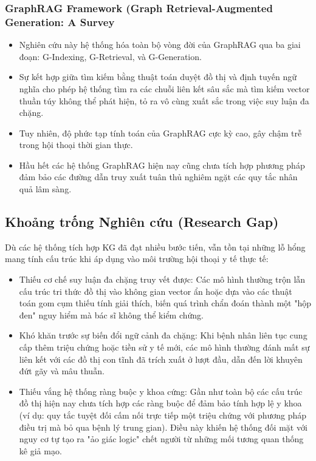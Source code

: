\documentclass[conference]{IEEEtran}
\begin{document}
\subsubsection{GraphRAG Framework (Graph Retrieval-Augmented Generation: A Survey \cite{peng2025graph}}
\begin{itemize}
    \item Nghiên cứu này hệ thống hóa toàn bộ vòng đời của GraphRAG qua ba giai đoạn: G-Indexing, G-Retrieval, và G-Generation.
    \item Sự kết hợp giữa tìm kiếm bằng thuật toán duyệt đồ thị và định tuyến ngữ nghĩa cho phép hệ thống tìm ra các chuỗi liên kết sâu sắc mà tìm kiếm vector thuần túy không thể phát hiện, tỏ ra vô cùng xuất sắc trong việc suy luận đa chặng.
    \item Tuy nhiên, độ phức tạp tính toán của GraphRAG cực kỳ cao, gây chậm trễ trong hội thoại thời gian thực.
    \item Hầu hết các hệ thống GraphRAG hiện nay cũng chưa tích hợp phương pháp đảm bảo các đường dẫn truy xuất tuân thủ nghiêm ngặt các quy tắc nhân quả lâm sàng.
\end{itemize}


\subsection{Khoảng trống Nghiên cứu (Research Gap)}

Dù các hệ thống tích hợp KG đã đạt nhiều bước tiến, vẫn tồn tại những lỗ hổng mang tính cấu trúc khi áp dụng vào môi trường hội thoại y tế thực tế:
\begin{itemize}
    \item Thiếu cơ chế suy luận đa chặng truy vết được: Các mô hình thường trộn lẫn cấu trúc tri thức đồ thị vào không gian vector ẩn hoặc dựa vào các thuật toán gom cụm thiếu tính giải thích, biến quá trình chẩn đoán thành một "hộp đen" nguy hiểm mà bác sĩ không thể kiểm chứng.
    \item Khó khăn trước sự biến đổi ngữ cảnh đa chặng: Khi bệnh nhân liên tục cung cấp thêm triệu chứng hoặc tiền sử y tế mới, các mô hình thường đánh mất sự liên kết với các đồ thị con tĩnh đã trích xuất ở lượt đầu, dẫn đến lời khuyên đứt gãy và mâu thuẫn.
    \item Thiếu vắng hệ thống ràng buộc y khoa cứng: Gần như toàn bộ các cấu trúc đồ thị hiện nay chưa tích hợp các ràng buộc để đảm bảo tính hợp lệ y khoa (ví dụ: quy tắc tuyệt đối cấm nối trực tiếp một triệu chứng với phương pháp điều trị mà bỏ qua bệnh lý trung gian). Điều này khiến hệ thống đối mặt với nguy cơ tự tạo ra "ảo giác logic" chết người từ những mối tương quan thống kê giả mạo.
\end{itemize}
\end{document}

